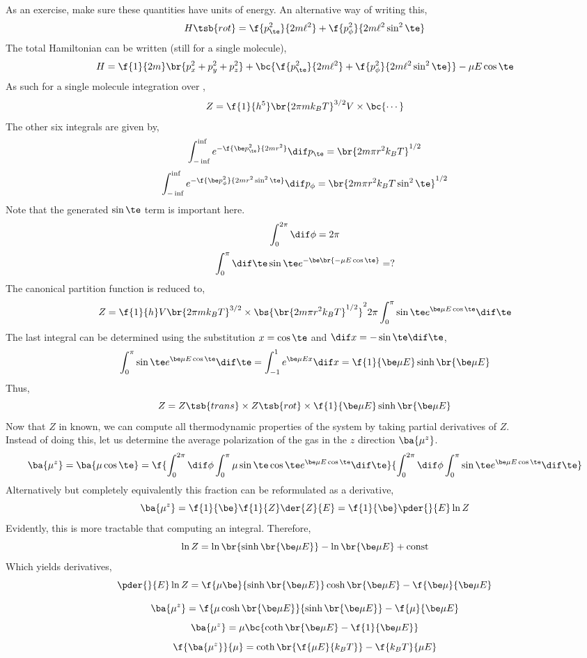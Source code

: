 \documentclass{article}
\begin{document}
As an exercise, make sure these quantities have units of energy. An alternative way of writing this,
\[ H\tsb{rot} = \f{p_\te^2}{2m \ell^2} + \f{p_\phi^2}{2m \ell^2 \sin^2 \te} \]
The total Hamiltonian can be written (still for a single molecule),
\[ H = \f{1}{2m}\br{p_x^2 + p_y^2 + p_z^2} + \bc{\f{p_\te^2}{2m \ell^2} + \f{p_\phi^2}{2m \ell^2 \sin^2 \te}} - \mu E \cos \te \]
As such for a single molecule integration over $ $,
\[ Z = \f{1}{h^5}\br{2\pi m k_B T}^{3/2} V \times \bc{\cdots} \]
The other six integrals are given by,
\[ \int_{-\inf}^{\inf} e^{-\f{\be p_\te^2}{2mr^2}} \dif p_\te = \br{2m\pi r^2 k_B T}^{1/2} \]
\[ \int_{-\inf}^{\inf} e^{-\f{\be p_\phi^2}{2mr^2\sin^2 \te}}  \dif p_\phi = \br{2m\pi r^2 k_B T \sin^2 \te}^{1/2} \]
Note that the generated $\sin \te$ term is important here.
\[ \int_{0}^{2\pi} \dif \phi = 2\pi \]
\[ \int_{0}^{\pi} \dif \te \sin \te e^{-\be\br{-\mu E \cos \te}} = ? \]
The canonical partition function is reduced to,
\[ Z = \f{1}{h} V \br{2\pi m k_B T}^{3/2} \times \bs{\br{2m \pi r^2 k_B T}^{1/2}}^2 2 \pi \int_{0}^{\pi} \sin \te e^{\be \mu E \cos \te} \dif \te \]
The last integral can be determined using the substitution $x = \cos \te$ and $\dif x = - \sin \te \dif \te$,
\[ \int_{0}^{\pi} \sin \te e^{\be \mu E \cos \te} \dif \te = \int_{-1}^{1} e^{\be \mu E x} \dif x = \f{1}{\be \mu E} \sinh \br{\be \mu E} \]
Thus,
\[ Z = Z\tsb{trans} \times Z\tsb{rot} \times  \f{1}{\be \mu E} \sinh \br{\be \mu E} \]
Now that $Z$ in known, we can compute all thermodynamic properties of the system by taking partial derivatives of $Z$.\\

Instead of doing this, let us determine the average polarization of the gas in the $z$ direction $\ba{\mu^z}$.
\[ \ba{\mu^z} = \ba{\mu \cos \te} = \f{\int_{0}^{2\pi} \dif \phi \int_{0}^{\pi} \mu\sin \te  \cos \te e^{\be \mu E \cos \te} \dif \te}{\int_{0}^{2\pi} \dif \phi \int_{0}^{\pi} \sin \te e^{\be \mu E \cos \te}
\dif \te} \]
Alternatively but completely equivalently this fraction can be reformulated as a derivative,
\[ \ba{\mu^z} = \f{1}{\be}\f{1}{Z} \der{Z}{E} = \f{1}{\be}\pder{}{E} \ln Z  \]
Evidently, this is more tractable that computing an integral. Therefore,
\[ \ln Z = \ln \br{\sinh \br{\be \mu E}} - \ln \br{\be \mu E} + \text{const} \]
Which yields derivatives,
\[ \pder{}{E}\ln Z = \f{\mu \be}{\sinh\br{\be \mu E}}\cosh\br{\be \mu E} - \f{\be \mu}{\be \mu E} \]

\[ \ba{\mu^z} = \f{\mu\cosh\br{\be \mu E}}{\sinh\br{\be \mu E}} - \f{\mu}{\be \mu E} \]
\[ \ba{\mu^z} = \mu\bc{\coth\br{\be \mu E} - \f{1}{\be \mu E}} \]
\[ \f{\ba{\mu^z}}{\mu} = \coth\br{ \f{\mu E}{k_B T}} - \f{k_B T}{\mu E} \]
\end{document}
